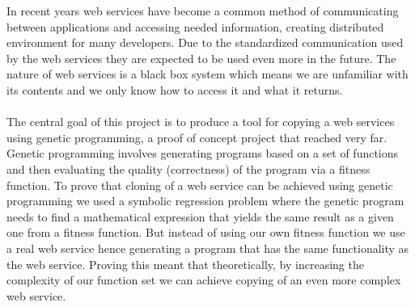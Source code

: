 In recent years web services have become a common method of communicating between applications
and accessing needed information, creating distributed environment for many developers.
Due to the standardized communication used by the web services they are expected to be used even 
more in the future. The nature of web
services is a black box system which means we are unfamiliar with its contents and we only know how to
access it and what it returns. 
\paragraph{}
The central goal of this project is to produce a tool for copying a web services using genetic
programming, a proof of concept project that reached very far. Genetic programming 
involves generating programs based on a set of functions and then evaluating the quality (correctness)
of the program via a fitness function. To prove that cloning of a web service can be achieved using
genetic programming we used a symbolic regression problem where the genetic program needs to find a 
mathematical expression that yields the same result as a given one from a fitness function. But 
instead of using our own fitness function we use a real web service hence generating a program
that has the same functionality as the web service. Proving this meant that theoretically, by increasing 
the complexity of our function set we can achieve copying of an even more complex web service.

